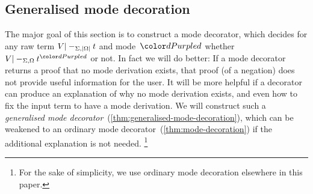 %

\subsection{Generalised mode decoration}
\label{sec:mode-decoration}

The major goal of this section is to construct a mode decorator, which decides for any raw term $V |-_{\Sigma,\left|\Omega\right|} t$ and mode~$\dir d$ whether $V |-_{\Sigma,\Omega} t^\dir{d}$ or not.
In fact we will do better:
If a mode decorator returns a proof that no mode derivation exists, that proof (of a negation) does not provide useful information for the user.
It will be more helpful if a decorator can produce an explanation of why no mode derivation exists, and even how to fix the input term to have a mode derivation.
We will construct such a \emph{generalised mode decorator}~(\cref{thm:generalised-mode-decoration}), which can be weakened to an ordinary mode decorator~(\cref{thm:mode-decoration}) if the additional explanation is not needed.%
\footnote{For the sake of simplicity, we use ordinary mode decoration elsewhere in this paper.}


